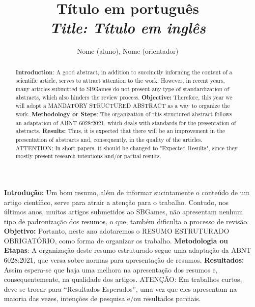 \documentclass[12pt]{article}
\title{Título em português \\
\medskip
\small{
    \textit{Title: Título em inglês}
}
}
\author{Nome (aluno)\inst{1}, Nome (orientador)\inst{1}}
\begin{document}
 
\maketitle

\thispagestyle{plain}

\pagestyle{plain2}

\begin{abstract}
\textbf{Introduction}: A good abstract, in addition to succinctly informing the content of a scientific article, serves to attract attention to the work. However, in recent years, many articles submitted to SBGames do not present any type of standardization of abstracts, which also hinders the review process.
\textbf{Objective:} Therefore, this year we will adopt a MANDATORY STRUCTURED ABSTRACT as a way to organize the work.
\textbf{Methodology or Steps}: The organization of this structured abstract follows an adaptation of ABNT 6028:2021, which deals with standards for the presentation of abstracts.
\textbf{Results:} Thus, it is expected that there will be an improvement in the presentation of abstracts and, consequently, in the quality of the articles. ATTENTION: In short papers, it should be changed to "Expected Results", since they mostly present research intentions and/or partial results.
\end{abstract}

     
\begin{resumo} 
  \textbf{Introdução:} Um bom resumo, além de informar sucintamente o conteúdo de um artigo científico, serve para atrair a atenção para o trabalho. Contudo, nos últimos anos, muitos artigos submetidos ao SBGames, não apresentam nenhum tipo de padronização dos resumos, o que, também dificulta o processo de revisão. 
  \textbf{Objetivo:} Portanto, neste ano adotaremos o RESUMO ESTRUTURADO OBRIGATÓRIO, como forma de organizar os trabalho. 
  \textbf{Metodologia ou Etapas}: A organização deste resumo estruturado segue uma adaptação da ABNT 6028:2021, que versa sobre normas para apresentação de resumos.
  \textbf{Resultados:} Assim espera-se que haja uma melhora na apresentação dos resumos e, consequentemente, na qualidade dos artigos. ATENÇÃO: Em trabalhos curtos, deve-se trocar para ``Resultados Esperados'', uma vez que eles apresentam na maioria das vezes, intenções de pesquisa e/ou resultados parciais.
\end{resumo}

\end{document}
